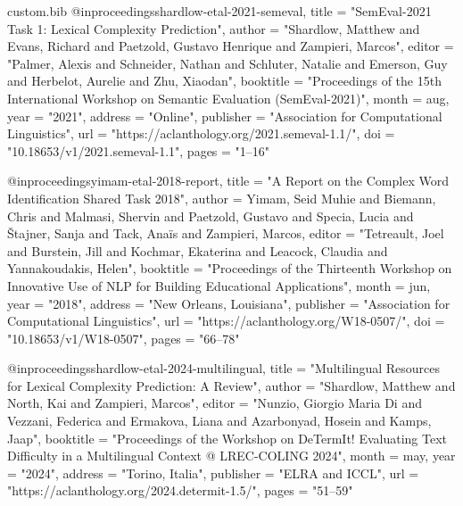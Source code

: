\begin{filecontents*}[overwrite]{custom.bib}
@inproceedings{shardlow-etal-2021-semeval,
    title = "{S}em{E}val-2021 Task 1: Lexical Complexity Prediction",
    author = "Shardlow, Matthew  and
      Evans, Richard  and
      Paetzold, Gustavo Henrique  and
      Zampieri, Marcos",
    editor = "Palmer, Alexis  and
      Schneider, Nathan  and
      Schluter, Natalie  and
      Emerson, Guy  and
      Herbelot, Aurelie  and
      Zhu, Xiaodan",
    booktitle = "Proceedings of the 15th International Workshop on Semantic Evaluation (SemEval-2021)",
    month = aug,
    year = "2021",
    address = "Online",
    publisher = "Association for Computational Linguistics",
    url = "https://aclanthology.org/2021.semeval-1.1/",
    doi = "10.18653/v1/2021.semeval-1.1",
    pages = "1--16"
}

@inproceedings{yimam-etal-2018-report,
    title = "A Report on the Complex Word Identification Shared Task 2018",
    author = {Yimam, Seid Muhie  and
      Biemann, Chris  and
      Malmasi, Shervin  and
      Paetzold, Gustavo  and
      Specia, Lucia  and
      {\v{S}}tajner, Sanja  and
      Tack, Ana{\"i}s  and
      Zampieri, Marcos},
    editor = "Tetreault, Joel  and
      Burstein, Jill  and
      Kochmar, Ekaterina  and
      Leacock, Claudia  and
      Yannakoudakis, Helen",
    booktitle = "Proceedings of the Thirteenth Workshop on Innovative Use of {NLP} for Building Educational Applications",
    month = jun,
    year = "2018",
    address = "New Orleans, Louisiana",
    publisher = "Association for Computational Linguistics",
    url = "https://aclanthology.org/W18-0507/",
    doi = "10.18653/v1/W18-0507",
    pages = "66--78"
}

@inproceedings{shardlow-etal-2024-multilingual,
    title = "Multilingual Resources for Lexical Complexity Prediction: A Review",
    author = "Shardlow, Matthew  and
      North, Kai  and
      Zampieri, Marcos",
    editor = "Nunzio, Giorgio Maria Di  and
      Vezzani, Federica  and
      Ermakova, Liana  and
      Azarbonyad, Hosein  and
      Kamps, Jaap",
    booktitle = "Proceedings of the Workshop on DeTermIt! Evaluating Text Difficulty in a Multilingual Context @ LREC-COLING 2024",
    month = may,
    year = "2024",
    address = "Torino, Italia",
    publisher = "ELRA and ICCL",
    url = "https://aclanthology.org/2024.determit-1.5/",
    pages = "51--59"
}


\end{filecontents*}
